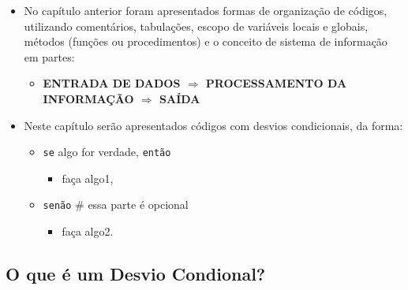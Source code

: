 \documentclass[12pt,a4paper]{article}
\providecommand{\tightlist}{%
      \setlength{\itemsep}{0pt}\setlength{\parskip}{0pt}}
\begin{document}
    \begin{itemize}
\item
  No capítulo anterior foram apresentados formas de organização de
  códigos, utilizando comentários, tabulações, escopo de variáveis
  locais e globais, métodos (funções ou procedimentos) e o conceito de
  sistema de informação em partes:

  \begin{itemize}
  \tightlist
  \item
    \textbf{ENTRADA DE DADOS \(\Rightarrow\) PROCESSAMENTO DA INFORMAÇÃO
    \(\Rightarrow\) SAÍDA}
  \end{itemize}
\item
  Neste capítulo serão apresentados códigos com desvios condicionais, da
  forma:

  \begin{itemize}
  \tightlist
  \item
    \texttt{se} algo for verdade, \texttt{então}

    \begin{itemize}
    \tightlist
    \item
      faça algo1,
    \end{itemize}
  \item
    \texttt{senão} \# essa parte é opcional

    \begin{itemize}
    \tightlist
    \item
      faça algo2.
    \end{itemize}
  \end{itemize}
\end{itemize}

    \hypertarget{o-que-uxe9-um-desvio-condional}{%
\subsection{O que é um Desvio
Condional?}\label{o-que-uxe9-um-desvio-condional}}
\end{document}
